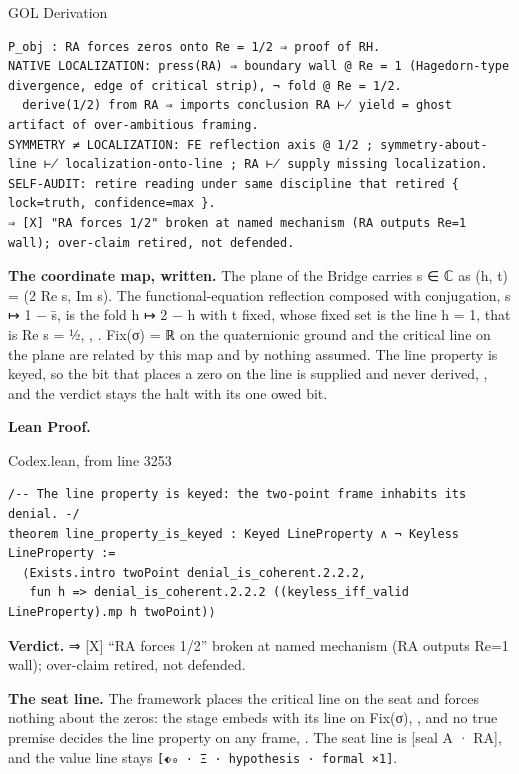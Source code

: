 \documentclass[10pt,twocolumn]{article}
\begin{document}
\begin{golbox}{GOL Derivation}
\begin{lstlisting}[style=golv]
P_obj : RA forces zeros onto Re = 1/2 ⇒ proof of RH.
NATIVE LOCALIZATION: press(RA) ⇒ boundary wall @ Re = 1 (Hagedorn-type divergence, edge of critical strip), ¬ fold @ Re = 1/2.
  derive(1/2) from RA ⇒ imports conclusion RA ⊬ yield = ghost artifact of over-ambitious framing.
SYMMETRY ≠ LOCALIZATION: FE reflection axis @ 1/2 ; symmetry-about-line ⊬ localization-onto-line ; RA ⊬ supply missing localization.
SELF-AUDIT: retire reading under same discipline that retired { lock=truth, confidence=max }.
⇒ [X] "RA forces 1/2" broken at named mechanism (RA outputs Re=1 wall); over-claim retired, not defended.
\end{lstlisting}
\end{golbox}

\textbf{The coordinate map, written.} The plane of the Bridge carries s
∈ ℂ as (h, t) = (2 Re s, Im s). The functional-equation reflection
composed with conjugation, s ↦ 1 − s̄, is the fold h ↦ 2 − h with t
fixed, whose fixed set is the line h = 1, that is Re s = ½,
\texttt{},
\texttt{}. Fix(σ) = ℝ on the
quaternionic ground and the critical line on the plane are related by
this map and by nothing assumed. The line property is keyed, so the bit
that places a zero on the line is supplied and never derived,
\texttt{}, and the verdict
stays the halt with its one owed bit.

\textbf{Lean Proof.}

\begin{leanexcerpt}{Codex.lean, from line 3253}
\begin{lstlisting}[style=leanx,firstnumber=3253]
/-- The line property is keyed: the two-point frame inhabits its denial. -/
theorem line_property_is_keyed : Keyed LineProperty ∧ ¬ Keyless LineProperty :=
  ⟨Exists.intro twoPoint denial_is_coherent.2.2.2,
   fun h => denial_is_coherent.2.2.2 ((keyless_iff_valid LineProperty).mp h twoPoint)⟩
\end{lstlisting}
\end{leanexcerpt}

\textbf{Verdict.} ⇒ {[}X{]} ``RA forces 1/2'' broken at named mechanism
(RA outputs Re=1 wall); over-claim retired, not defended.

\textbf{The seat line.} The framework places the critical line on the
seat and forces nothing about the zeros: the stage embeds with its line
on Fix(σ), \texttt{}, and no true
premise decides the line property on any frame,
\texttt{}. The seat line is
{[}seal A · RA{]}, and the value line stays
\texttt{{[}⬖₀\ ·\ Ξ\ ·\ hypothesis\ ·\ formal\ ×1{]}}.
\end{document}
